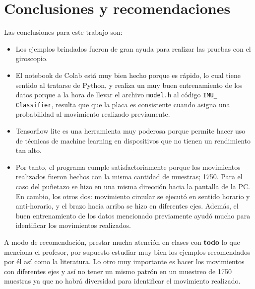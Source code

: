 \section{Conclusiones y recomendaciones}
Las conclusiones para este trabajo son:
\begin{itemize}
\item Los ejemplos brindados fueron de gran ayuda para realizar las pruebas con el giroscopio.
\item El notebook de Colab está muy bien hecho porque es rápido, lo cual tiene sentido al tratarse de Python, y realiza un muy buen entrenamiento de los datos porque a la hora de llevar el archivo \texttt{model.h} al código \texttt{IMU\_ Classifier}, resulta que que la placa es consistente cuando asigna una probabilidad al movimiento realizado previamente.
\item Tensorflow lite es una herramienta muy poderosa porque permite hacer uso de técnicas de machine learning en dispositivos que no tienen un rendimiento tan alto.
\item Por tanto, el programa cumple satisfactoriamente porque los movimientos realizados fueron hechos con la misma cantidad de muestras; 1750. Para el caso del puñetazo se hizo en una misma dirección hacia la pantalla de la PC. En cambio, los otros dos: movimiento circular se ejecutó en sentido horario y anti-horario, y el brazo hacia arriba se hizo en diferentes ejes. Además, el buen entrenamiento de los datos mencionado previamente ayudó mucho para identificar los movimientos realizados.
\end{itemize}
A modo de recomendación, prestar mucha atención en clases con \textbf{todo} lo que menciona el profesor, por supuesto estudiar muy bien los ejemplos recomendados por él así como la literatura. Lo otro muy importante es hacer los movimientos con diferentes ejes y así no tener un mismo patrón en un muestreo de 1750 muestras ya que no habrá diversidad para identificar el movimiento realizado.
